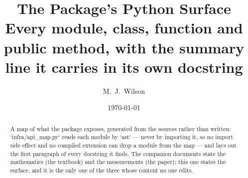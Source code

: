 \documentclass[11pt,a4paper]{article}
\title{The Package's Python Surface \\
\large Every module, class, function and public method, with the summary line
it carries in its own docstring}
\author{M.\ J.\ Wilson}
\date{\today}
\begin{document}
\maketitle

\label{sec:api}

\begin{abstract}
\noindent
A map of what the package exposes, generated from the sources rather than
written: `infra/api\_map.py` reads each module by `ast` --- never by importing
it, so no import side effect and no compiled extension can drop a module from
the map --- and lays out the first paragraph of every docstring it finds. The
companion documents state the mathematics (the textbook) and the measurements
(the paper); this one states the surface, and it is the only one of the three
whose content no one edits.
\end{abstract}

\tableofcontents
\clearpage


\end{document}
